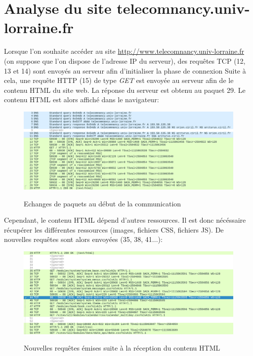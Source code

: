 \documentclass[a4paper,11pt, oneside]{book}
\def\widthImage{1}
\begin{document}
		\section{Analyse du site telecomnancy.univ-lorraine.fr}

		Lorsque l'on souhaite accéder au site \href{http://www.telecomnancy.univ-lorraine.fr}{http://www.telecomnancy.univ-lorraine.fr} (on suppose que l'on dispose de l'adresse
		IP du serveur), des requêtes TCP (12, 13 et 14) sont envoyés au serveur afin d'initialiser la phase de connexion
		Suite à cela, une requête HTTP (15) de type \textit{GET} est envoyée au serveur afin de le contenu HTML du site web. La réponse du serveur est
		obtenu au paquet 29. Le contenu HTML est alors affiché dans le navigateur:

		\begin{figure} [htbp]
			\centering
			\includegraphics[width=\widthImage\textwidth]{1.png}\\
			\caption{Echanges de paquets au début de la communication}
		\end{figure}

		\noindent Cependant, le contenu HTML dépend d'autres ressources. Il est donc nécéssaire
		récupérer les différentes ressources (images, fichiers CSS, fichiers JS). De nouvelles requêtes sont alors envoyées (35, 38, 41...):

		\begin{figure} [htbp]
			\centering
			\includegraphics[width=\widthImage\textwidth]{2.png}\\
			\caption{Nouvelles requêtes émises suite à la réception du contenu HTML}
		\end{figure}
\end{document}
